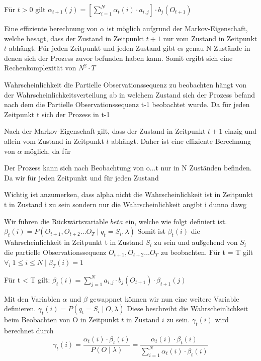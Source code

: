 Für $t>0$ gilt
$\alpha_{t+1}(j) = \left[ \sum_{i=1}^{N} \alpha_t(i) \cdot a_{i,j} \right] \cdot b_j(O_{t+1})$

Eine effiziente berechnung von $\alpha$ ist möglich aufgrund der Markov-Eigenschaft,
welche besagt, dass der Zustand in Zeitpunkt $t+1$ nur vom Zustand in Zeitpunkt $t$ abhängt.
Für jeden Zeitpunkt und jeden Zustand gibt es genau N Zustände in denen sich
der Prozess zuvor befunden haben kann.
Somit ergibt sich eine Rechenkomplexität von $N^2 \cdot T$


Wahrscheinlichkeit die Partielle Observationssequenz zu beobachten 
hängt von der Wahrscheinlichkeitsverteilung ab in welchem Zustand
sich der Prozess befand nach dem die Partielle Observationssequenz t-1
beobachtet wurde. Da für jeden Zeitpunkt t sich der Prozess in t-1 

Nach der Markov-Eigenschaft gilt, dass der Zustand in Zeitpunkt $t+1$
einzig und allein vom Zustand in Zeitpunkt $t$ abhängt.
Daher ist eine effiziente Berechnung von $\alpha$ möglich, da für

Der Prozess kann sich nach Beobachtung von o...t nur in N Zuständen befinden.
Da wir für jeden Zeitpunkt und für jeden Zustand 


Wichtig ist anzumerken, dass alpha nicht die Wahrscheinlichkeit ist 
in Zeitpunkt t in Zustand i zu sein sondern nur die 
Wahrscheinlichkeit angibt i dunno dawg

Wir führen die Rückwärtsvariable $beta$ ein, welche wie folgt definiert ist.
$\beta_t(i) = P(O_{t+1}, O_{t+2} \dots O_T \mid q_t = S_i, \lambda)$
Somit ist $\beta_t(i)$ die Wahrscheinlichkeit in Zeitpunkt t in Zustand $S_i$ zu sein
und außgehend von $S_i$ die partielle Observationssequenz $O_{t+1}, O_{t+2} \dots O_T$
zu beobachten.
Für t = T gilt
$\forall_i \  1 \leq i \leq N \mid \beta_T(i) = 1  $

Für t < T gilt:
$\beta_t(i) = \sum_{j=1}^{N} a_{i,j} \cdot b_j(O_{t+1}) \cdot \beta_{t+1}(j)$

Mit den Variablen $\alpha$ und $\beta$ gewappnet können wir nun eine weitere Variable definieren.
$\gamma_t(i) = P(q_t = S_i \mid O, \lambda)$
Diese beschreibt die Wahrscheinlichkeit beim Beobachten von O in Zeitpunkt $t$ in Zustand $i$
zu sein. $\gamma_t(i)$ wird berechnet durch
\begin{equation}
\gamma_t(i)
= \frac{\alpha_t(i) \cdot \beta_t(i)}{P(O \mid \lambda)}
= \frac{\alpha_t(i) \cdot \beta_t(i)}{\sum_{i=1}^{N} \alpha_t(i) \cdot \beta_t(i)}
\end{equation}




